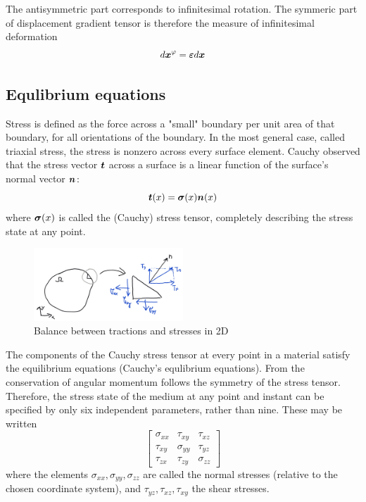 The antisymmetric part corresponds to infinitesimal rotation. The symmeric part of displacement gradient tensor is therefore the measure of infinitesimal deformation
$$
d\mbox{\boldmath$x$}^\varphi = \mbox{\boldmath$\varepsilon$} d\mbox{\boldmath$x$}
$$
\subsection{Equlibrium equations}
Stress is defined as the force across a "small" boundary per unit area of that boundary, for all orientations of the boundary. In the most general case, called triaxial stress, the stress is nonzero across every surface element. Cauchy observed that the stress vector $\mbox{\boldmath$t$}$ across a surface is a linear function of the surface's normal vector $\mbox{\boldmath$n$}$:
$$
\mbox{\boldmath$t$}(x)=\mbox{\boldmath$\sigma$}(x)\mbox{\boldmath$n$}(x)
$$
where $\mbox{\boldmath$\sigma$}(x)$ is called the (Cauchy) stress tensor, completely describing the stress state at any point.
\begin{figure}
  \begin{center}
    \includegraphics[width=0.5\textwidth]{figs/tractionstressrelation.png}
  \end{center}
  \label{fig:tractionstressrelation}
  \caption{Balance between tractions and stresses in 2D}
\end{figure}

The components of the Cauchy stress tensor at every point in a material satisfy the equilibrium equations (Cauchy’s equlibrium equations). From the conservation of angular momentum follows the symmetry of the stress tensor. Therefore, the stress state of the medium at any point and instant can be specified by only six independent parameters, rather than nine. These may be written
$$
\left[
  \begin{array}{ccc}
    \sigma_{xx} & \tau_{xy} & \tau_{xz}\\
    \tau_{xy} & \sigma_{yy} & \tau_{yz}\\
    \tau_{zx} & \tau_{zy} & \sigma_{zz}
  \end{array}
\right] 
$$
where the elements $\sigma_{xx}, \sigma_{yy}, \sigma_{zz}$ are called the normal stresses (relative to the chosen coordinate system), and $\tau_{yz}, \tau_{xz}, \tau_{xy}$ the shear stresses.

